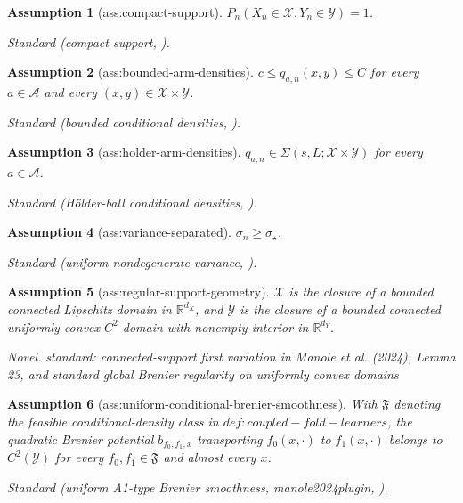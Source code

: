 \documentclass{article}
\newtheorem{assumption}{Assumption}
\begin{document}
\begin{assumption}[ass:compact-support]\label{ass:compact-support}
\(P_n(X_n\in\mathcal X,Y_n\in\mathcal Y)=1\).
\par\smallskip\noindent\emph{Standard} (compact support, \cite{lin2026statistical}).
\end{assumption}

\begin{assumption}[ass:bounded-arm-densities]\label{ass:bounded-arm-densities}
\(c\le q_{a,n}(x,y)\le C\) for every \(a\in\mathcal A\) and every \((x,y)\in\mathcal X\times\mathcal Y\).
\par\smallskip\noindent\emph{Standard} (bounded conditional densities, \cite{lin2026statistical}).
\end{assumption}

\begin{assumption}[ass:holder-arm-densities]\label{ass:holder-arm-densities}
\(q_{a,n}\in\Sigma(s,L;\mathcal X\times\mathcal Y)\) for every \(a\in\mathcal A\).
\par\smallskip\noindent\emph{Standard} (Hölder-ball conditional densities, \cite{lin2026statistical}).
\end{assumption}

\begin{assumption}[ass:variance-separated]\label{ass:variance-separated}
\(\sigma_n\ge\sigma_\star\).
\par\smallskip\noindent\emph{Standard} (uniform nondegenerate variance, \cite{chernozhukov2018double}).
\end{assumption}

\begin{assumption}[ass:regular-support-geometry]\label{ass:regular-support-geometry}
\(\mathcal X\) is the closure of a bounded connected Lipschitz domain in \(\mathbb R^{d_X}\), and \(\mathcal Y\) is the closure of a bounded connected uniformly convex \(C^2\) domain with nonempty interior in \(\mathbb R^{d_Y}\).
\par\smallskip\noindent\emph{Novel.} standard: connected-support first variation in Manole et al. (2024), Lemma 23, and standard global Brenier regularity on uniformly convex domains
\end{assumption}

\begin{assumption}[ass:uniform-conditional-brenier-smoothness]\label{ass:uniform-conditional-brenier-smoothness}
With \(\mathfrak F\) denoting the feasible conditional-density class in \(def:coupled-fold-learners\), the quadratic Brenier potential \(b_{f_0,f_1,x}\) transporting \(f_0(x,\cdot)\) to \(f_1(x,\cdot)\) belongs to \(C^2(\mathcal Y)\) for every \(f_0,f_1\in\mathfrak F\) and almost every \(x\).
\par\smallskip\noindent\emph{Standard} (uniform A1-type Brenier smoothness, manole2024plugin, \cite{manole2024plugin}).
\end{assumption}
\end{document}
